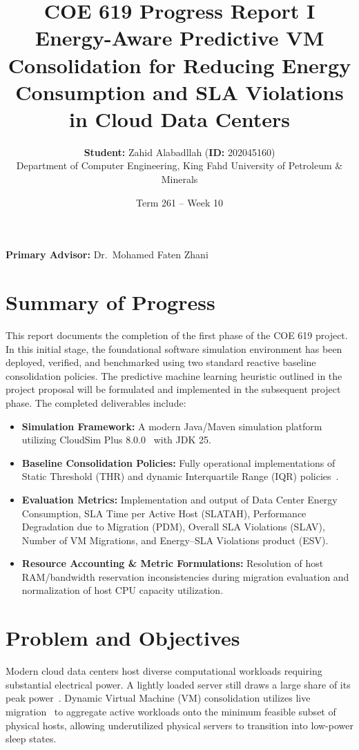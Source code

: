 \documentclass[11pt,a4paper]{article}
\title{
  \vspace{-1.5em}
  {\huge\bfseries\color{kfupmgreen} COE 619 Progress Report I}\\[0.5em]
  {\Large Energy-Aware Predictive VM Consolidation for Reducing Energy Consumption and SLA Violations in Cloud Data Centers}
}
\author{
  \textbf{Student:} Zahid Alabadllah \quad (\textbf{ID:} 202045160)\\[0.2em]
  \small Department of Computer Engineering, King Fahd University of Petroleum \& Minerals
}
\date{\small Term 261 -- Week 10}
\begin{document}
\maketitle

\vspace{-1.5em}
\begin{center}
  \colorbox{kfupmgreen!8}{%
    \parbox{0.9\linewidth}{\centering \textbf{Primary Advisor:} Dr.~Mohamed Faten Zhani}%
  }
\end{center}
\vspace{0.8em}

\section{Summary of Progress}
This report documents the completion of the first phase of the COE 619 project. In this initial stage, the foundational software simulation environment has been deployed, verified, and benchmarked using two standard reactive baseline consolidation policies. The predictive machine learning heuristic outlined in the project proposal will be formulated and implemented in the subsequent project phase. The completed deliverables include:
\begin{itemize}[leftmargin=1.8em, itemsep=2pt]
  \item \textbf{Simulation Framework:} A modern Java/Maven simulation platform utilizing CloudSim Plus 8.0.0~\cite{cloudsimplus} with JDK 25.
  \item \textbf{Baseline Consolidation Policies:} Fully operational implementations of Static Threshold (THR) and dynamic Interquartile Range (IQR) policies~\cite{beloglazov2012ccpe}.
  \item \textbf{Evaluation Metrics:} Implementation and output of Data Center Energy Consumption, SLA Time per Active Host (SLATAH), Performance Degradation due to Migration (PDM), Overall SLA Violations (SLAV), Number of VM Migrations, and Energy--SLA Violations product (ESV).
  \item \textbf{Resource Accounting \& Metric Formulations:} Resolution of host RAM/bandwidth reservation inconsistencies during migration evaluation and normalization of host CPU capacity utilization.
\end{itemize}

\section{Problem and Objectives}
Modern cloud data centers host diverse computational workloads requiring substantial electrical power. A lightly loaded server still draws a large share of its peak power~\cite{beloglazov2012ccpe}. Dynamic Virtual Machine (VM) consolidation utilizes live migration~\cite{clark2005} to aggregate active workloads onto the minimum feasible subset of physical hosts, allowing underutilized physical servers to transition into low-power sleep states.
\end{document}
